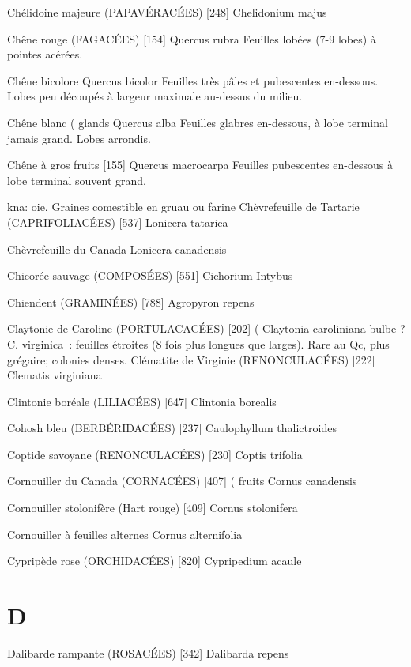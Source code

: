 Chélidoine majeure (PAPAVÉRACÉES)  [248]
				Chelidonium majus

Chêne rouge (FAGACÉES)  [154]
				Quercus rubra
Feuilles lobées (7-9 lobes) à pointes acérées.

Chêne bicolore
				Quercus bicolor
Feuilles très pâles et pubescentes en-dessous. Lobes peu découpés à largeur maximale au-dessus du milieu.

Chêne blanc							( glands
				Quercus alba
Feuilles glabres en-dessous, à lobe terminal jamais grand. Lobes arrondis.


Chêne à gros fruits  [155]
				Quercus macrocarpa
Feuilles pubescentes en-dessous à lobe terminal souvent grand.
\herbskip
{}		
							
\textgreek{kna}: oie. Graines comestible en gruau ou farine
\herbskip
Chèvrefeuille de Tartarie (CAPRIFOLIACÉES)  [537]
				Lonicera tatarica

Chèvrefeuille du Canada 
				Lonicera canadensis

Chicorée sauvage (COMPOSÉES)  [551]
				Cichorium Intybus

Chiendent (GRAMINÉES)  [788]
				Agropyron repens

Claytonie de Caroline (PORTULACACÉES)  [202]			(
				Claytonia caroliniana			bulbe
? C. virginica : feuilles étroites (8 fois plus longues que larges).
Rare au Qc, plus grégaire; colonies denses.
Clématite de Virginie (RENONCULACÉES)  [222]
				Clematis virginiana

Clintonie boréale (LILIACÉES)  [647]
				Clintonia borealis

Cohosh bleu (BERBÉRIDACÉES)  [237]
				Caulophyllum thalictroides

Coptide savoyane (RENONCULACÉES)  [230]
				Coptis trifolia

Cornouiller du Canada (CORNACÉES)  [407]			( fruits
				Cornus canadensis

Cornouiller stolonifère (Hart rouge)  [409]
				Cornus stolonifera

Cornouiller à feuilles alternes
				Cornus alternifolia

Cypripède rose (ORCHIDACÉES)  [820]
				Cypripedium acaule

\chapter*{D}

Dalibarde rampante (ROSACÉES)  [342]
				Dalibarda repens

